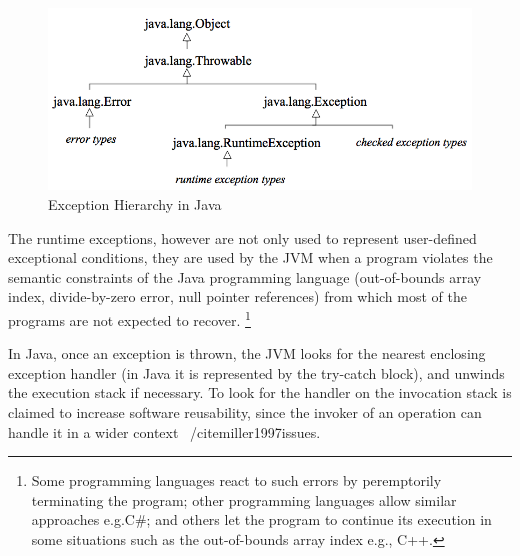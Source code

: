 \documentclass[conference]{IEEEtran}
\begin{document}
\begin{figure} \centering \includegraphics[width=\hsize]{new2_hierarchy.png}
  \caption{Exception Hierarchy in Java} \label{fig:exchier} \end{figure}

The runtime exceptions, however are not only used to represent user-defined
exceptional conditions, they are used by the JVM when a program violates 
the semantic constraints of the Java programming language (out-of-bounds array index, divide-by-zero 
error, null pointer references) from which most of the programs are not expected to recover. 
\footnote{Some programming languages react to such errors by peremptorily terminating the program; 
other programming languages allow similar approaches e.g.C\#; and others let the program to continue
 its execution in some situations such as the out-of-bounds array index e.g., C++. }



In Java, once an exception is thrown, the JVM looks for the nearest enclosing exception handler
(in Java it is represented by the try-catch block), and unwinds the execution stack if necessary.
 To look for the handler on the invocation stack is claimed to increase software reusability, 
since the invoker of an operation can handle it in a wider context ~/cite{miller1997issues}.
\end{document}
